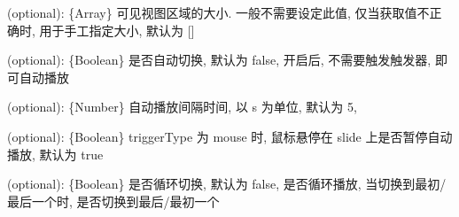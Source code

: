 \documentclass[letterpaper,10pt,english]{sphinxmanual}
\begin{document}

\begin{fulllineitems}
\label{api/component/switchable/switchable:Switchable.Switchable.viewSize}
(optional): \{Array\} 可见视图区域的大小. 一般不需要设定此值, 仅当获取值不正确时, 用于手工指定大小, 默认为 {[}{]}

\end{fulllineitems}



\begin{fulllineitems}
\label{api/component/switchable/switchable:Switchable.autoplay}
(optional):  \{Boolean\} 是否自动切换, 默认为 false, 开启后, 不需要触发触发器, 即可自动播放

\end{fulllineitems}



\begin{fulllineitems}
\label{api/component/switchable/switchable:Switchable.interval}
(optional):  \{Number\} 自动播放间隔时间, 以 s 为单位, 默认为 5,

\end{fulllineitems}



\begin{fulllineitems}
\label{api/component/switchable/switchable:Switchable.pauseOnHover}
(optional):  \{Boolean\} triggerType 为 mouse 时, 鼠标悬停在 slide 上是否暂停自动播放, 默认为 true

\end{fulllineitems}



\begin{fulllineitems}
\label{api/component/switchable/switchable:Switchable.circular}
(optional):  \{Boolean\} 是否循环切换, 默认为 false, 是否循环播放, 当切换到最初/最后一个时, 是否切换到最后/最初一个

\end{fulllineitems}


\end{document}
